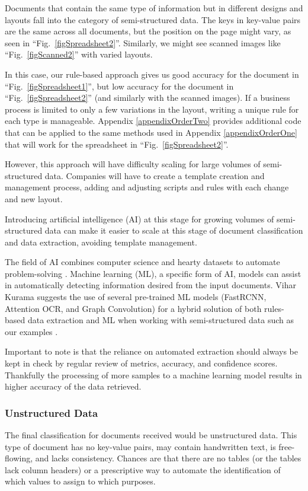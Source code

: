 \documentclass[conference]{IEEEtran}
\begin{document}
Documents that contain the same type of information but in different designs and layouts fall into the category of semi-structured data. The keys in key-value pairs are the same across all documents, but the position on the page might vary, as seen in ``Fig.~\ref{figSpreadsheet2}''. Similarly, we might see scanned images like ``Fig.~\ref{figScanned2}'' with varied layouts.

In this case, our rule-based approach gives us good accuracy for the document in ``Fig.~\ref{figSpreadsheet1}'', but low accuracy for the document in ``Fig.~\ref{figSpreadsheet2}'' (and similarly with the scanned images). If a business process is limited to only a few variations in the layout, writing a unique rule for each type is manageable. Appendix \ref{appendixOrderTwo} provides additional code that can be applied to the same methods used in Appendix \ref{appendixOrderOne} that will work for the spreadsheet in ``Fig.~\ref{figSpreadsheet2}''.

However, this approach will have difficulty scaling for large volumes of semi-structured data. Companies will have to create a template creation and management process, adding and adjusting scripts and rules with each change and new layout.

Introducing artificial intelligence (AI) at this stage for growing volumes of semi-structured data can make it easier to scale at this stage of document classification and data extraction, avoiding template management. 

The field of AI combines computer science and hearty datasets to automate problem-solving \cite{ibm:ai}. Machine learning (ML), a specific form of AI, models can assist in automatically detecting information desired from the input documents. Vihar Kurama suggests the use of several pre-trained ML models (FastRCNN, Attention OCR, and Graph Convolution) for a hybrid solution of both rules-based data extraction and ML when working with semi-structured data such as our examples \cite{kurama2021a}.

Important to note is that the reliance on automated extraction should always be kept in check by regular review of metrics, accuracy, and confidence scores. Thankfully the processing of more samples to a machine learning model results in higher accuracy of the data retrieved.

\subsubsection{Unstructured Data}
The final classification for documents received would be unstructured data. This type of document has no key-value pairs, may contain handwritten text, is free-flowing, and lacks consistency. Chances are that there are no tables (or the tables lack column headers) or a prescriptive way to automate the identification of which values to assign to which purposes.
\end{document}
